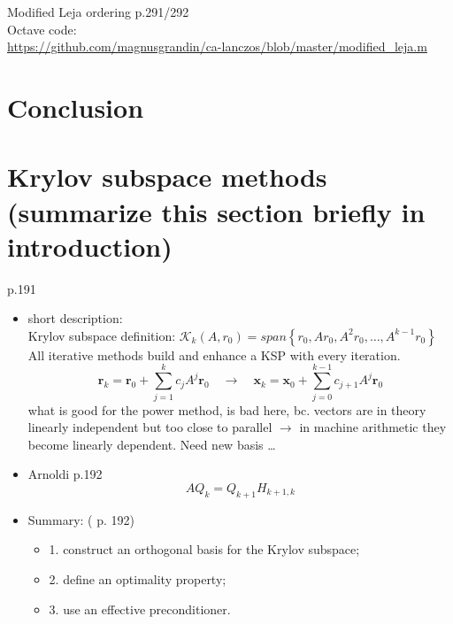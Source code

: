\documentclass{scrartcl}
\begin{document}
Modified Leja ordering \cite{Hoemmen:2010:CKS:1970638} p.291/292\\

Octave code:\\
\url{https://github.com/magnusgrandin/ca-lanczos/blob/master/modified_leja.m}
\fi

\section{Conclusion}

\section*{Krylov subspace methods (summarize this section briefly in introduction)}

\cite{Ascher:2011:FCN:2031413} p.191\\
\begin{itemize}
\item short description:\\
Krylov subspace definition: $\mathcal{K}_k(A, r_0) = span \left\{ r_0, Ar_0, A^2r_0,\ldots,A^{k-1}r_0 \right\}$\\

All iterative methods build and enhance a KSP with every iteration.
\begin{equation*}
\textbf{r}_k = \textbf{r}_0 + \sum_{j=1}^{k} c_jA^j\textbf{r}_0 \quad \to \quad \textbf{x}_k = \textbf{x}_0 + \sum_{j=0}^{k-1} c_{j+1}A^j\textbf{r}_0
\end{equation*}
what is good for the power method, is bad here, bc. vectors are in theory linearly independent but too close to parallel $\to$ in machine arithmetic they become linearly dependent. Need new basis \ldots 
\item Arnoldi \cite{Ascher:2011:FCN:2031413} p.192
\begin{equation*}
AQ_k = Q_{k+1}H_{k+1,k}
\end{equation*}
\item Summary: (\cite{Ascher:2011:FCN:2031413} p. 192)
	\begin{itemize}
	\item 1. construct an orthogonal basis for the Krylov subspace;
	\item 2. define an optimality property;
	\item 3. use an effective preconditioner.
	\end{itemize}
\end{itemize}
\end{document}
